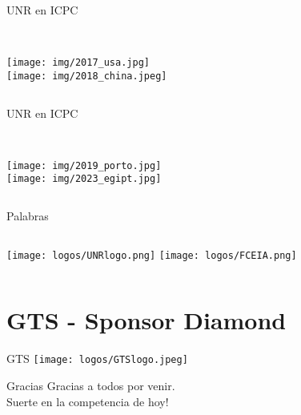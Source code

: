 \documentclass{beamer}
\begin{document}
\begin{frame}{UNR en ICPC}
    \begin{columns}[t]
        \\
        \texttt{[image: img/2017\_usa.jpg]}
        \\
        \texttt{[image: img/2018\_china.jpeg]}
    \end{columns}
\end{frame}

\begin{frame}{UNR en ICPC}
    \begin{columns}[t]
        \\
        \texttt{[image: img/2019\_porto.jpg]}
        \\
        \texttt{[image: img/2023\_egipt.jpg]}
    \end{columns}
\end{frame}

\begin{frame}{Palabras}
    \begin{columns}[t]
        \centering
        \texttt{[image: logos/UNRlogo.png]}
        \centering
        \texttt{[image: logos/FCEIA.png]}
    \end{columns}
\end{frame}

\section{GTS - Sponsor Diamond}
    
\begin{frame}{GTS}
    \centering
    \texttt{[image: logos/GTSlogo.jpeg]}
\end{frame}


\begin{frame}{Gracias}
    \centering
    Gracias a todos por venir.\\
    Suerte en la competencia de hoy!
\end{frame}
\end{document}
